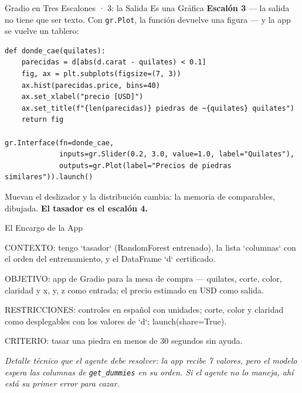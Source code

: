 \documentclass[aspectratio=169, 11pt]{beamer}
\begin{document}
\begin{frame}[fragile, shrink=5]{Gradio en Tres Escalones · 3: la Salida Es una Gráfica}
  \vspace{-2pt}
  {\scriptsize\color{textMuted}
   \textbf{Escalón 3} --- la salida no tiene que ser texto. Con
   \texttt{gr.Plot}, la función devuelve una figura --- y la app se vuelve
   un tablero:}
  \vspace{2pt}
  \begin{verbatim}
def donde_cae(quilates):
    parecidas = d[abs(d.carat - quilates) < 0.1]
    fig, ax = plt.subplots(figsize=(7, 3))
    ax.hist(parecidas.price, bins=40)
    ax.set_xlabel("precio [USD]")
    ax.set_title(f"{len(parecidas)} piedras de ~{quilates} quilates")
    return fig

gr.Interface(fn=donde_cae,
             inputs=gr.Slider(0.2, 3.0, value=1.0, label="Quilates"),
             outputs=gr.Plot(label="Precios de piedras similares")).launch()
  \end{verbatim}
  \vspace{2pt}
  {\scriptsize\color{textMuted}
   Muevan el deslizador y la distribución cambia: la memoria de comparables,
   dibujada. \textbf{El tasador es el escalón 4.}}
\end{frame}

\begin{frame}[shrink=5]{El Encargo de la App}
  \vspace{2pt}
  \begin{prompt}
CONTEXTO: tengo `tasador` (RandomForest entrenado),
la lista `columnas` con el orden del entrenamiento,
y el DataFrame `d` certificado.

OBJETIVO: app de Gradio para la mesa de compra ---
quilates, corte, color, claridad y x, y, z como
entrada; el precio estimado en USD como salida.

RESTRICCIONES: controles en español con unidades;
corte, color y claridad como desplegables con los
valores de `d`; launch(share=True).

CRITERIO: tasar una piedra en menos de 30 segundos
sin ayuda.
  \end{prompt}
  \vspace{2pt}
  {\scriptsize\color{arcaDark}\itshape
   Detalle técnico que el agente debe resolver: la app recibe 7 valores,
   pero el modelo espera las columnas de \texttt{get\_dummies} en su orden.
   Si el agente no lo maneja, ahí está su primer error para cazar.}
\end{frame}
\end{document}

